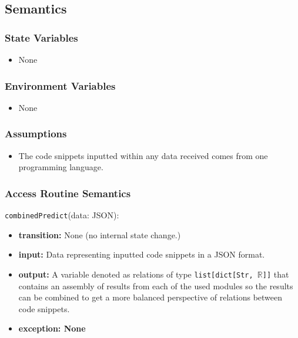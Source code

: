 \documentclass[12pt, titlepage]{article}
\begin{document}
\begin{itemize}
\subsection{Semantics}

\subsubsection{State Variables}

\begin{itemize}
    \item None
\end{itemize}

\subsubsection{Environment Variables}

\begin{itemize}
  \item None
\end{itemize}

\subsubsection{Assumptions}

\begin{itemize}
    \item The code snippets inputted within any data received comes from one programming language.
\end{itemize}

\subsubsection{Access Routine Semantics}
\noindent \texttt{combinedPredict}(data: JSON):
\begin{itemize}
    \item \textbf{transition:} None (no internal state change.)
    \item \textbf{input:} Data representing inputted code snippets in a JSON format.
    \item \textbf{output:} A variable denoted as relations of type \texttt{list[dict[Str, $\mathbb{R}$]]} that contains an assembly of results from each of the used modules so the results can be combined to get a more balanced perspective of relations between code snippets.
    \item \textbf{exception: None}
\end{itemize}


\end{itemize}
\end{document}
